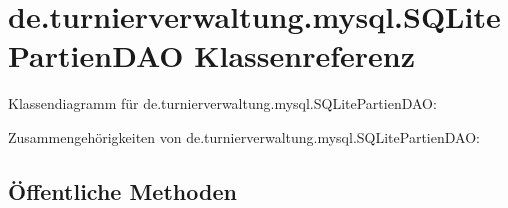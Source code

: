 \hypertarget{classde_1_1turnierverwaltung_1_1mysql_1_1_s_q_lite_partien_d_a_o}{}\section{de.\+turnierverwaltung.\+mysql.\+S\+Q\+Lite\+Partien\+D\+AO Klassenreferenz}
\label{classde_1_1turnierverwaltung_1_1mysql_1_1_s_q_lite_partien_d_a_o}


Klassendiagramm für de.\+turnierverwaltung.\+mysql.\+S\+Q\+Lite\+Partien\+D\+AO\+:


Zusammengehörigkeiten von de.\+turnierverwaltung.\+mysql.\+S\+Q\+Lite\+Partien\+D\+AO\+:
\subsection*{Öffentliche Methoden}
